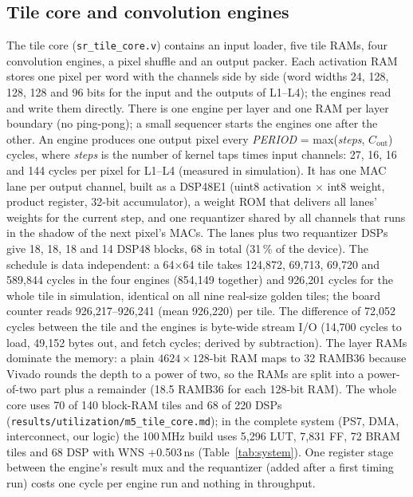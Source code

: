 \documentclass[conference]{IEEEtran}
\begin{document}
\subsection{Tile core and convolution engines}
The tile core (\texttt{sr\_tile\_core.v}) contains an input loader, five tile RAMs, four convolution engines, a pixel shuffle and an output packer.
Each activation RAM stores one pixel per word with the channels side by side (word widths 24, 128, 128, 128 and 96 bits for the input and the outputs of L1--L4); the engines read and write them directly.
There is one engine per layer and one RAM per layer boundary (no ping-pong); a small sequencer starts the engines one after the other.
An engine produces one output pixel every \textit{PERIOD} = max(\textit{steps}, $C_\mathrm{out}$) cycles, where \textit{steps} is the number of kernel taps times input channels: 27, 16, 16 and 144 cycles per pixel for L1--L4 (measured in simulation).
It has one MAC lane per output channel, built as a DSP48E1 (uint8 activation $\times$ int8 weight, product register, 32-bit accumulator), a weight ROM that delivers all lanes' weights for the current step, and one requantizer shared by all channels that runs in the shadow of the next pixel's MACs.
The lanes plus two requantizer DSPs give 18, 18, 18 and 14 DSP48 blocks, 68 in total (31\,\% of the device).
The schedule is data independent: a 64$\times$64 tile takes 124{,}872, 69{,}713, 69{,}720 and 589{,}844 cycles in the four engines (854{,}149 together) and 926{,}201 cycles for the whole tile in simulation, identical on all nine real-size golden tiles; the board counter reads 926{,}217--926{,}241 (mean 926{,}220) per tile.
The difference of 72{,}052 cycles between the tile and the engines is byte-wide stream I/O (14{,}700 cycles to load, 49{,}152 bytes out, and fetch cycles; derived by subtraction).
The layer RAMs dominate the memory: a plain $4624\times128$-bit RAM maps to 32 RAMB36 because Vivado rounds the depth to a power of two, so the RAMs are split into a power-of-two part plus a remainder (18.5 RAMB36 for each 128-bit RAM). The whole core uses 70 of 140 block-RAM tiles and 68 of 220 DSPs
(\texttt{results/\allowbreak{}utilization/\allowbreak{}m5\_tile\_core.md}); in the complete system (PS7, DMA, interconnect, our logic) the 100\,MHz build uses 5{,}296 LUT, 7{,}831 FF, 72 BRAM tiles and 68 DSP with WNS +0.503\,ns (Table~\ref{tab:system}).
One register stage between the engine's result mux and the requantizer (added after a first timing run) costs one cycle per engine run and nothing in throughput.
\end{document}
